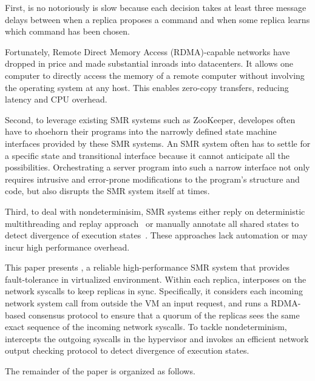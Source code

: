 First, \paxos is no notoriously is slow because each decision takes at least three message delays 
between when a replica proposes a command and when some replica learns which command has been chosen.

Fortunately, Remote Direct Memory Access (RDMA)-capable networks have dropped in price and made 
substantial inroads into datacenters. It allows one computer to directly access the memory of 
a remote computer without involving the operating system at any host. This enables zero-copy 
transfers, reducing latency and CPU overhead.

Second, to leverage existing SMR systems such as ZooKeeper, developes often have to shoehorn their 
programs into the narrowly defined state machine interfaces provided by these SMR systems. An SMR 
system often has to settle for a specific state and transitional interface because it cannot 
anticipate all the possibilities. Orchestrating a server program into such a narrow interface not 
only requires intrusive and error-prone modifications to the program's structure and code, but also 
disrupts the SMR system itself at times.

Third, to deal with nondeterminisim, SMR systems either reply on deterministic multithreading and replay 
approach~\cite{rex:eurosys14} or manually annotate all shared states to detect divergence of execution 
states~\cite{eve:osdi12}. These approaches lack automation or may incur high performance overhead.

This paper presents \xxx, a reliable high-performance SMR system that provides fault-tolerance 
in virtualized environment. Within each replica, \xxx interposes on the network syscalls to keep 
replicas in sync. Specifically, it considers each incoming network system call from outside the VM 
an input request, and runs a RDMA-based \paxos consensus protocol to ensure that a quorum of the 
replicas sees the same exact sequence of the incoming network syscalls. To tackle nondeterminism, 
\xxx intercepts the outgoing syscalls in the hypervisor and invokes an efficient network output 
checking protocol to detect divergence of execution states.

The remainder of the paper is organized as follows.
